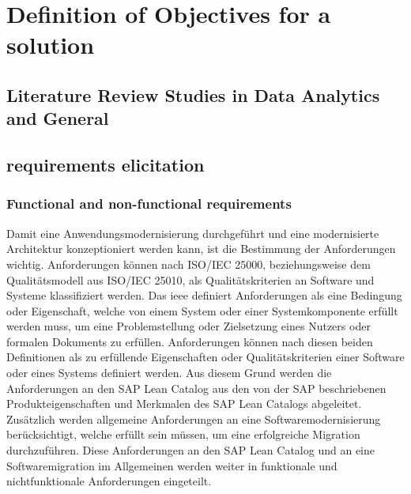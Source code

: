\newpage\section{Definition of Objectives for a solution}\label{sec:objectForSolution}

\subsection{Literature Review Studies in Data Analytics and General}

\subsection{requirements elicitation}

\subsubsection{Functional and non-functional requirements}

Damit eine Anwendungsmodernisierung durchgeführt und eine modernisierte Architektur konzeptioniert werden kann, ist die Bestimmung der Anforderungen wichtig.\autocite[Vgl.][Kapitel 3]{Seacord.2003} Anforderungen können nach ISO/IEC 25000, beziehungsweise dem Qualitätsmodell aus ISO/IEC 25010, als Qualitätskriterien an Software und Systeme klassifiziert werden.\autocite[Vgl.][]{ISOIEC25010.2011} Das \ac{ieee} definiert Anforderungen als eine Bedingung oder Eigenschaft, welche von einem System oder einer Systemkomponente erfüllt werden muss, um eine Problemstellung oder Zielsetzung eines Nutzers oder formalen Dokuments zu erfüllen.\autocite[Vgl.][S.62]{IEEE.1990} Anforderungen können nach diesen beiden Definitionen als zu erfüllende Eigenschaften oder Qualitätskriterien einer Software oder eines Systems definiert werden. Aus diesem Grund werden die Anforderungen an den SAP Lean Catalog aus den von der SAP beschriebenen Produkteigenschaften und Merkmalen des SAP Lean Catalogs abgeleitet. Zusätzlich werden allgemeine Anforderungen an eine Softwaremodernisierung berücksichtigt, welche erfüllt sein müssen, um eine erfolgreiche Migration durchzuführen. Diese Anforderungen an den SAP Lean Catalog und an eine Softwaremigration im Allgemeinen werden weiter in funktionale und nichtfunktionale Anforderungen eingeteilt. %

